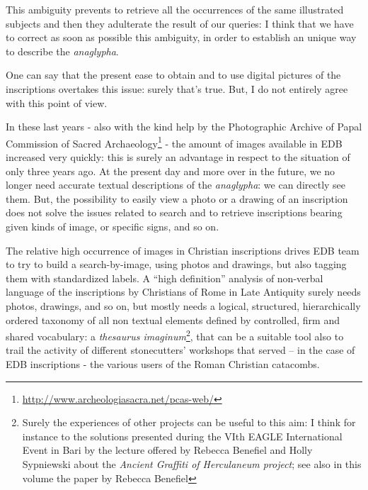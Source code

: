\documentclass[amsthm,ebook]{saparticle}
\begin{document}
%



This ambiguity prevents to retrieve all the occurrences of the same illustrated subjects and then they adulterate the
result of our queries: I think that we have to correct as soon as possible this ambiguity, in order to establish an
unique way to describe the \emph{anaglypha}. 

One can say that the present ease to obtain and to use digital pictures of the inscriptions overtakes this issue: surely
that's true. But, I do not entirely agree with this point of view. 

In these last years - also with the kind help by the Photographic Archive of Papal Commission of Sacred Archaeology\footnote{\url{http://www.archeologiasacra.net/pcas-web/}}
 - the amount of images available in EDB increased very quickly: this is
surely an advantage in respect to the situation of only three years ago. At the present day and more over in the
future, we no longer need accurate textual descriptions of the \emph{anaglypha}: we can directly see them. But, the
possibility to easily view a photo or a drawing of an inscription does not solve the issues related to search and to
retrieve inscriptions bearing given kinds of image, or specific signs, and so on. 

The relative high occurrence of images in Christian inscriptions drives EDB team to try to build a search-by-image,
using photos and drawings, but also tagging them with standardized labels. A “high definition” analysis of non-verbal
language of the inscriptions by Christians of Rome in Late Antiquity surely needs photos, drawings, and so on, but
mostly needs a logical, structured, hierarchically ordered taxonomy of all non textual elements defined by controlled,
firm and shared vocabulary: a \emph{thesaurus imaginum}\footnote{ Surely the experiences of other projects can be useful to
this aim: I think for instance to the solutions presented during the VIth EAGLE International Event in Bari by the
lecture offered by Rebecca Benefiel and Holly Sypniewski about the \emph{Ancient Graffiti of Herculaneum project}; see also in this volume the paper by Rebecca Benefiel}, that can
be a suitable tool also to trail the activity of different stonecutters’ workshops that served – in the case of EDB
inscriptions - the various users of the Roman Christian catacombs. 
\end{document}
